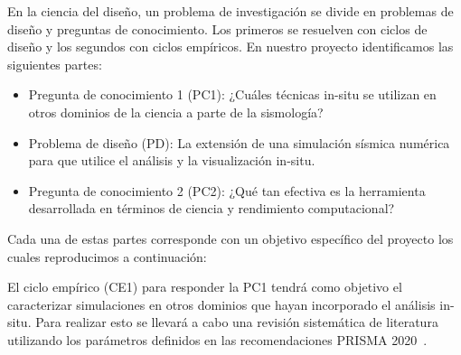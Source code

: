 En la ciencia del diseño, un problema de investigación se divide en problemas de diseño y preguntas de conocimiento. Los primeros se resuelven con ciclos de diseño y los segundos con ciclos empíricos. En nuestro proyecto identificamos las siguientes partes:

\begin{itemize}
    \item Pregunta de conocimiento 1 (PC1): ¿Cuáles técnicas in-situ se utilizan en otros dominios de la ciencia a parte de la sismología?
    \item Problema de diseño (PD): La extensión de una simulación sísmica numérica para que utilice el análisis y la visualización in-situ.
    \item Pregunta de conocimiento 2 (PC2): ¿Qué tan efectiva es la herramienta desarrollada en términos de ciencia y rendimiento computacional?
\end{itemize}
Cada una de estas partes corresponde con un objetivo específico del proyecto los cuales reproducimos a continuación:


El ciclo empírico (CE1) para responder la PC1 tendrá como objetivo el caracterizar simulaciones en otros dominios que hayan incorporado el análisis in-situ. Para realizar esto se llevará a cabo una revisión sistemática de literatura utilizando los parámetros definidos en las recomendaciones PRISMA 2020~\cite{Page2021}. 

